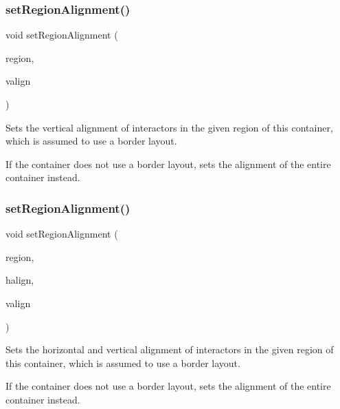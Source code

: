 \subsubsection{\texorpdfstring{set\+Region\+Alignment()}{setRegionAlignment()}\hspace{0.1cm}{\footnotesize\ttfamily [2/5]}}
{\footnotesize\ttfamily void set\+Region\+Alignment (\begin{DoxyParamCaption}\item[{\mbox{\hyperlink{classGContainer_a81a01a86de31071a92e6cce0bab9bc4b}{Region}}}]{region,  }\item[{Vertical\+Alignment}]{valign }\end{DoxyParamCaption})\hspace{0.3cm}{\ttfamily [virtual]}}



Sets the vertical alignment of interactors in the given region of this container, which is assumed to use a border layout. 

If the container does not use a border layout, sets the alignment of the entire container instead. \mbox{\label{classGContainer_ab4d2bfcca7a18da2847e7b4494da4a16}} 
\subsubsection{\texorpdfstring{set\+Region\+Alignment()}{setRegionAlignment()}\hspace{0.1cm}{\footnotesize\ttfamily [3/5]}}
{\footnotesize\ttfamily void set\+Region\+Alignment (\begin{DoxyParamCaption}\item[{\mbox{\hyperlink{classGContainer_a81a01a86de31071a92e6cce0bab9bc4b}{Region}}}]{region,  }\item[{Horizontal\+Alignment}]{halign,  }\item[{Vertical\+Alignment}]{valign }\end{DoxyParamCaption})\hspace{0.3cm}{\ttfamily [virtual]}}



Sets the horizontal and vertical alignment of interactors in the given region of this container, which is assumed to use a border layout. 

If the container does not use a border layout, sets the alignment of the entire container instead. \mbox{\label{classGContainer_ae4ff46516be9472498c0bf058b496e8b}} 
